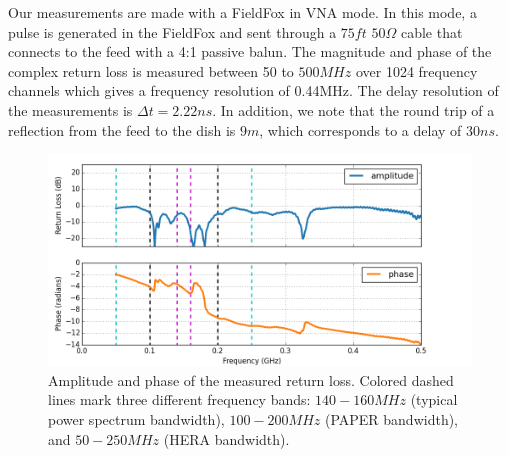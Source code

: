 \documentclass[12pt,preprint]{aastex}
\begin{document}
Our measurements are made with a FieldFox in VNA mode. In this mode, a pulse
is generated in the FieldFox and sent through a $75ft$ $50\Omega$ cable that
connects to the feed with a 4:1 passive balun. The magnitude and phase of the complex return loss is measured between 50 to $500MHz$ over 1024 frequency channels which gives a frequency resolution of 0.44MHz. The delay resolution of the measurements is $\Delta{t}=2.22ns$.
In addition, we note that the round trip of a reflection from the feed to the dish
is $9m$, which corresponds to a delay of $30ns$.



\begin{figure}[ht!]
\centering
\includegraphics[totalheight=0.4\textheight]{plots/frequency_amp_phase_fullbw.png}
\caption{Amplitude and phase of the measured return loss. Colored dashed lines
mark three different frequency bands: $140-160MHz$ (typical power spectrum bandwidth), $100-200MHz$ (PAPER bandwidth), and
$50-250MHz$ (HERA bandwidth).}
\label{fig:freq}
\end{figure}
\end{document}
